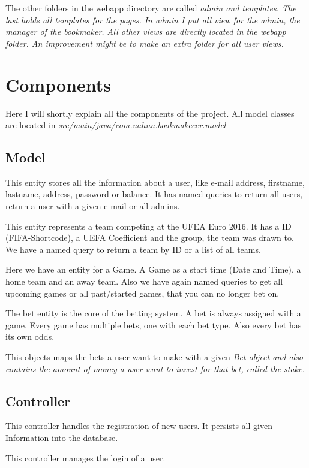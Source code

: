 \documentclass[11pt, halfparskip]{scrreprt}
\begin{document}
The other folders in the webapp directory are called \em{admin} and \em{templates}. The last holds all templates for the pages. In \em{admin} I put all view for the admin, the manager of the bookmaker. All other views are directly located in the webapp folder. An improvement might be to make an extra folder for all user views. 

\chapter{Components}
Here I will shortly explain all the components of the project. All model classes are located in \em{src/main/java/com.uahnn.bookmakeeer.model}

\section{Model}
This entity stores all the information about a user, like e-mail address, firstname, lastname, address, password or balance. It has named queries to return all users, return a user with a given e-mail or all admins.

This entity represents a team competing at the UFEA Euro 2016. It has a ID (FIFA-Shortcode), a UEFA Coefficient and the group, the team was drawn to. We have a named query to return a team by ID or a list of all teams.

Here we have an entity for a Game. A Game as a start time (Date and Time), a home team and an away team. Also we have again named queries to get all upcoming games or all past/started games, that you can no longer bet on.

The bet entity is the core of the betting system. A bet is always assigned with a game. Every game has multiple bets, one with each bet type. Also every bet has its own odds.

This objects maps the bets a user want to make with a given \em{Bet} object and also contains the amount of money a user want to invest for that bet, called the stake.

\section{Controller}
This controller handles the registration of new users. It persists all given Information into the database.

This controller manages the login of a user. 
\end{document}
